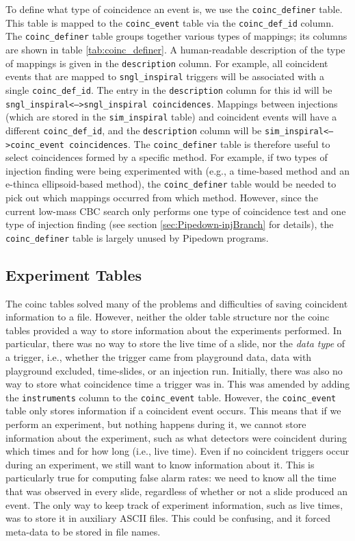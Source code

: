 To define what type of coincidence an event is, we use the
\texttt{coinc\_definer} table. This table is mapped to the
\texttt{coinc\_event} table via the \texttt{coinc\_def\_id} column. The
\texttt{coinc\_definer} table groups together various types of mappings; its
columns are shown in table \ref{tab:coinc_definer}. A human-readable description
of the type of mappings is given in the \texttt{description} column. For
example, all coincident events that are mapped to \texttt{sngl\_inspiral}
triggers will be associated with a single \texttt{coinc\_def\_id}. The entry in
the \texttt{description} column for this id will be
\texttt{sngl\_inspiral<-->sngl\_inspiral coincidences}. Mappings between
injections (which are stored in the \texttt{sim\_inspiral} table) and
coincident events will have a different \texttt{coinc\_def\_id}, and the
\texttt{description} column will be \texttt{sim\_inspiral<-->coinc\_event
coincidences}. The \texttt{coinc\_definer} table is therefore useful to select
coincidences formed by a specific method. For example, if two types of
injection finding were being experimented with (e.g., a time-based method and
an e-thinca ellipsoid-based method), the \texttt{coinc\_definer} table would be
needed to pick out which mappings occurred from which method. However, since
the current low-mass \ac{CBC} search only performs one type of coincidence test
and one type of injection finding (see section \ref{sec:Pipedown-injBranch} for
details), the \texttt{coinc\_definer} table is largely unused by Pipedown
programs.

\subsection{Experiment Tables}
\label{sec:experiment_tables}

The coinc tables solved many of the problems and difficulties of saving
coincident information to a file. However, neither the older table structure
nor the coinc tables provided a way to store information about the experiments
performed. In particular, there was no way to store the live time of a slide,
nor the \emph{data type} of a trigger, i.e., whether the trigger came from
playground data, data with playground excluded, time-slides, or an injection
run. Initially, there was also no way to store what coincidence time a trigger
was in. This was amended by adding the \texttt{instruments} column to the
\texttt{coinc\_event} table. However, the \texttt{coinc\_event} table only
stores information if a coincident event occurs. This means that if we perform
an experiment, but nothing happens during it, we cannot store information about
the experiment, such as what detectors were coincident during which times and
for how long (i.e., live time). Even if no coincident triggers occur during an
experiment, we still want to know information about it. This is particularly
true for computing false alarm rates: we need to know all the time that was
observed in every slide, regardless of whether or not a slide produced an
event. The only way to keep track of experiment information, such as live
times, was to store it in auxiliary ASCII files. This could be confusing, and
it forced meta-data to be stored in file names.

